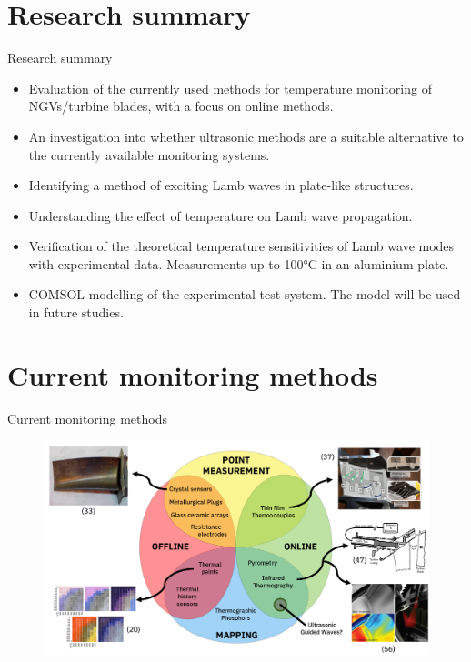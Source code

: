 \documentclass[aspectratio=169, 9pt]{beamer}
\begin{document}
\section{Research summary}
\begin{frame}{Research summary}
  \begin{itemize}
    \item Evaluation of the currently used methods for temperature monitoring of NGVs/turbine blades, with a focus on online methods.
    \item An investigation into whether ultrasonic methods are a suitable alternative to the currently available monitoring systems.
    \item Identifying a method of exciting Lamb waves in plate-like structures.
    \item Understanding the effect of temperature on Lamb wave propagation.
    \item Verification of the theoretical temperature sensitivities of Lamb wave modes with experimental data. Measurements up to 100\si{\degreeCelsius} in an aluminium plate.
    \item COMSOL modelling of the experimental test system. The model will be used in future studies.
\end{itemize} 
\end{frame}


\section{Current monitoring methods}
\begin{frame}{Current monitoring methods}

\begin{figure}
  \centering
  \includegraphics[width=\textwidth]{images/venndiagram.png}
\end{figure}
\end{frame}
\end{document}
